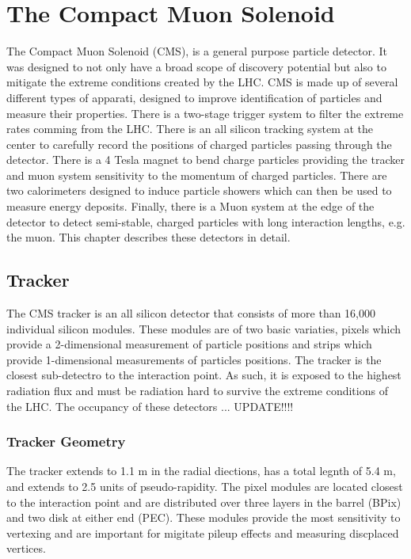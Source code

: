 \chapter{The Compact Muon Solenoid}
\label{sec:CMS}

The Compact Muon Solenoid (CMS), is a general purpose particle detector.  It
was designed to not only have a broad scope of discovery potential but also
to mitigate the extreme conditions created by the LHC.  CMS is made up of
several different types of apparati, designed to improve identification of 
particles and measure their properties.  There is a two-stage trigger system
to filter the extreme rates comming from the LHC.  There is an all silicon tracking 
system at the center to carefully record the positions of charged particles passing 
through the detector.  There is a 4 Tesla magnet to bend charge particles 
providing the tracker and muon system sensitivity to the momentum of charged 
particles.  There are two calorimeters designed to induce particle showers which 
can then be used to measure energy deposits.  Finally, there is a Muon system 
at the edge of the detector to detect semi-stable, charged particles with long 
interaction lengths, e.g. the muon. This chapter describes these detectors in
detail. 

\section{Tracker}
\label{sec:Tracker}

The CMS tracker is an all silicon detector that consists of more than 16,000
individual silicon modules.  These modules are of two basic variaties, pixels
which provide a 2-dimensional measurement of particle positions and strips
which provide 1-dimensional measurements of particles positions.  The tracker
is the closest sub-detectro to the interaction point.  As such, it is exposed to
the highest radiation flux and must be radiation hard to survive the extreme
conditions of the LHC.  The occupancy of these detectors ... UPDATE!!!!
\subsection{Tracker Geometry}

The tracker extends to 1.1 m in the radial diections,  has a total legnth 
of 5.4 m, and extends to 2.5 units of pseudo-rapidity.  The pixel modules
are located closest to the interaction point and are distributed over three
layers in the barrel (BPix) and two disk at either end (PEC).  These modules
provide the most sensitivity to vertexing and are important for migitate 
pileup effects and measuring discplaced vertices.  

